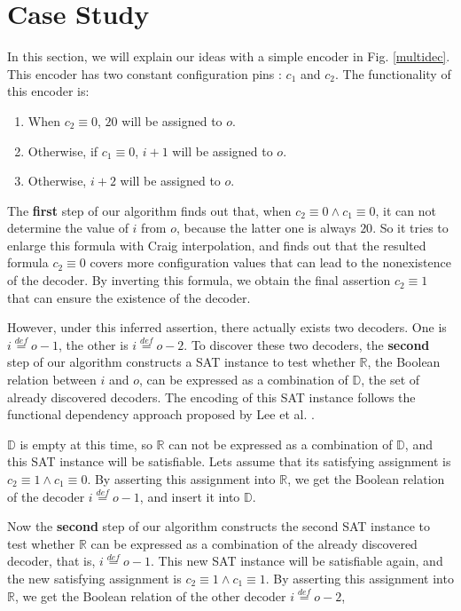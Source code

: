 \documentclass[journal]{IEEEtran}
\begin{document}
\section{Case Study}\label{sec_casestudy}
In this section,
we will explain our ideas with a simple encoder in Fig. \ref{multidec}.
This encoder has two constant configuration pins :
$c_1$ and $c_2$.
The functionality of this encoder is:
\begin{enumerate}
 \item When $c_2\equiv 0$,
$20$ will be assigned to $o$.
 \item Otherwise,
if $c_1\equiv 0$,
$i+1$ will be assigned to $o$.
 \item Otherwise,
$i+2$ will be assigned to $o$.
\end{enumerate}

The \textbf{first} step of our algorithm finds out that,
when $c_2\equiv 0 \wedge c_1\equiv 0$,
it can not determine the value of $i$ from $o$,
because the latter one is always $20$.
So it tries to enlarge this formula with Craig interpolation,
and finds out that the resulted formula $c_2\equiv 0$ covers more configuration values that can lead to the nonexistence of the decoder.
By inverting this formula,
we obtain the final assertion $c_2\equiv 1$ that can ensure the existence of the decoder.

However,
under this inferred assertion,
there actually exists two decoders.
One is $i\stackrel{def}{=}o-1$,
the other is $i\stackrel{def}{=}o-2$.
To discover these two decoders,
the \textbf{second} step of our algorithm constructs a SAT instance to test whether $\mathbb{R}$,
the Boolean relation between $i$ and $o$,
can be expressed as a combination of $\mathbb{D}$,
the set of already discovered decoders.
The encoding of this SAT instance follows the functional dependency approach proposed by Lee et al. \cite{funcdep}.

$\mathbb{D}$ is empty at this time,
so $\mathbb{R}$ can not be expressed as a combination of $\mathbb{D}$,
and this SAT instance will be satisfiable.
Lets assume that its satisfying assignment is  $c_2\equiv 1 \wedge c_1\equiv 0$.
By asserting this assignment into $\mathbb{R}$,
we get the Boolean relation of the decoder $i\stackrel{def}{=}o-1$,
and insert it into $\mathbb{D}$.

Now the \textbf{second} step of our algorithm constructs the second SAT instance to test whether $\mathbb{R}$ can be expressed as a combination of the already discovered decoder,
that is,
$i\stackrel{def}{=}o-1$.
This new SAT instance will be satisfiable again,
and the new satisfying assignment is $c_2\equiv 1 \wedge c_1\equiv 1$.
By asserting this assignment into $\mathbb{R}$,
we get the Boolean relation of the other decoder $i\stackrel{def}{=}o-2$,
\end{document}
